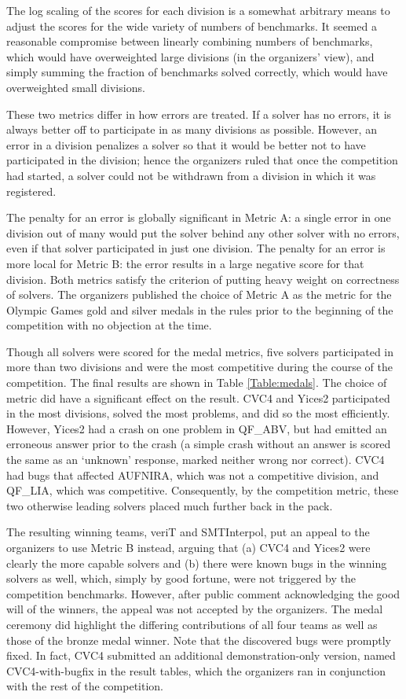 \documentclass[twosize,11pt]{article}
\begin{document}
The log scaling of the scores for each division is a somewhat arbitrary means to adjust the scores for the wide variety of numbers of benchmarks. It seemed a reasonable compromise between linearly combining numbers of benchmarks, which would have overweighted large divisions (in the organizers' view), and simply summing the fraction of benchmarks solved correctly, which would have overweighted small divisions.

These two metrics differ in how errors are treated. If a solver has no errors, it is always better off to participate in as many divisions as possible. However, an error in a division penalizes a solver so that it would be better not to have participated in the division; hence the organizers ruled that once the competition had started, a solver could not be withdrawn from a division in which it was registered.

The penalty for an error is globally significant in Metric A: a single error in one division out of many would put the solver behind any other solver with no errors, even if that solver participated in just one division. The penalty for an error is more local for Metric B: the error results in a large negative score for that division. Both metrics satisfy the criterion of putting heavy weight on correctness of solvers.
The organizers published the choice of Metric A as the metric for the Olympic Games gold and silver medals in the rules prior to the beginning of the competition with no objection at the time.

Though all solvers were scored for the medal metrics, five solvers participated in more than two divisions and were the most competitive during the course of the competition. The final results are shown in Table \ref{Table:medals}. The choice of metric did have a significant effect on the result. CVC4 and Yices2 participated in the most divisions, solved the most problems, and did so the most efficiently. However, Yices2 had a crash on one problem in QF\_ABV, but had emitted an erroneous answer prior to the crash (a simple crash without an answer is scored the same as an `unknown' response, marked neither wrong nor correct). CVC4 had bugs that affected AUFNIRA, which was not a competitive division, and QF\_LIA,
which was competitive. Consequently, by the competition metric, these two otherwise leading solvers placed much further back in the pack.

The resulting winning teams, veriT and SMTInterpol, put an appeal to the organizers to use Metric B instead, arguing that (a) CVC4 and Yices2 were clearly the more capable solvers and (b) there were known bugs in the winning solvers as well, which, simply by good fortune, were not triggered by the competition benchmarks. However, after public comment acknowledging the good will of the winners, the appeal was not accepted by the organizers. The medal ceremony did highlight the differing contributions of all four teams as well as those of the bronze medal winner. Note that the discovered bugs were promptly fixed. In fact, CVC4 submitted an additional demonstration-only version, named CVC4-with-bugfix in the result tables, which the organizers ran in conjunction with the rest of the competition.
\end{document}
